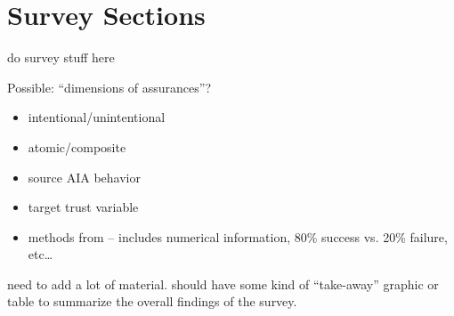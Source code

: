 \section{Survey Sections} \label{sec:survey}
do survey stuff here

Possible: ``dimensions of assurances''?

\begin{itemize}
    \item intentional/unintentional
    \item atomic/composite
    \item source AIA behavior
    \item target trust variable
    \item methods from \cite{Lacave2002-cu} -- includes numerical information, 80\% success vs. 20\% failure, etc\ldots
\end{itemize}

need to add a lot of material. should have some kind of ``take-away'' graphic or table to summarize the overall findings of the survey.
